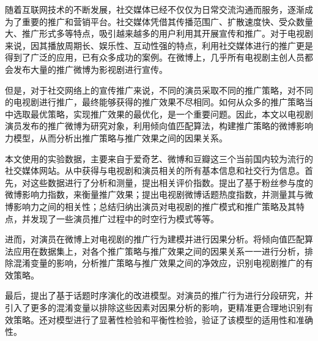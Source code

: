 \makeatletter
\ifthu@bachelor\relax\else
  \ifthu@doctor
  \else
    \ifthu@master
    \fi
  \fi
\fi
\makeatother



\begin{cabstract}

随着互联网技术的不断发展，社交媒体已经不仅仅为日常交流沟通而服务，逐渐成为了重要的推广和营销平台。社交媒体凭借其传播范围广、扩散速度快、受众数量大、推广形式多等特点，吸引越来越多的用户利用其开展宣传和推广。对于电视剧来说，因其播放周期长、娱乐性、互动性强的特点，利用社交媒体进行的推广更是得到了广泛的应用，已有众多成功的案例。在微博上，几乎所有电视剧主创人员都会发布大量的推广微博为影视剧进行宣传。

但是，对于社交网络上的宣传推广来说，不同的演员采取不同的推广策略，对不同的电视剧进行推广，最终能够获得的推广效果不尽相同。如何从众多的推广策略当中选取最优策略，实现推广效果的最优化，是一个重要问题。因此，本文以电视剧演员发布的推广微博为研究对象，利用倾向值匹配算法，构建推广策略的微博影响力模型，从而分析出推广策略与推广效果之间的因果关系。

本文使用的实验数据，主要来自于爱奇艺、微博和豆瓣这三个当前国内较为流行的社交媒体网站。从中获得与电视剧和演员相关的所有基本信息和社交行为信息。首先，对这些数据进行了分析和测量，提出相关评价指数。提出了基于粉丝参与度的微博影响力指数，来衡量推广效果；提出电视剧微博话题热度指数，并测量其与微博影响力之间的相关性；总结归纳出演员对电视剧的推广模式和推广策略及其特点，并发现了一些演员推广过程中的时空行为模式等等。

进而，对演员在微博上对电视剧的推广行为建模并进行因果分析。将倾向值匹配算法应用在数据集上，对各个推广策略与推广效果之间的因果关系一一进行分析，排除混淆变量的影响，分析推广策略与推广效果之间的净效应，识别电视剧推广的有效策略。

最后，提出了基于话题时序演化的改进模型。对演员的推广行为进行分段研究，并引入了更多的混淆变量以排除这些因素对因果分析的影响，更精准更合理地识别有效策略。还对模型进行了显著性检验和平衡性检验，验证了该模型的适用性和准确性。

\end{cabstract}

